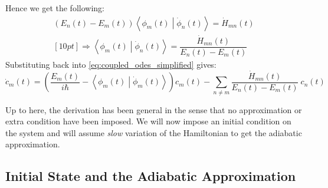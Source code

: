 \documentclass[12pt,a4paper]{article}
\begin{document}
	Hence we get the following:
	\begin{eqnarray}
		\left( E_{n}(t) - E_{m}(t) \right) \left\langle \phi_{m}(t) \middle| \dot{\phi}_{n}(t) \right\rangle = \dot{H}_{mn}(t) \\ [10pt]
		\Rightarrow \left\langle \phi_{m}(t) \middle| \dot{\phi}_{n}(t) \right\rangle = \dfrac{\dot{H}_{mn}(t)}{E_{n}(t) - E_{m}(t)}
		\label{eq:coupling_element}
	\end{eqnarray}
	Substituting back into \eqref{eq:coupled_odes_simplified} gives:
	\begin{equation}
		\boxed{
			\dot{c}_{m}(t) = \left( \frac{E_{m}(t)}{i \hbar} - \left\langle \phi_{m}(t) \middle| \dot{\phi}_{m}(t) \right\rangle \right)c_{m}(t) - \sum_{n \neq m} \dfrac{\dot{H}_{mn}(t)}{E_{n}(t) - E_{m}(t)}\ c_{n}(t)}
		\label{eq:final_coupled_odes}
	\end{equation}
	
	Up to here, the derivation has been general in the sense that no approximation or extra condition have been imposed. We will now impose an initial condition on the system and will assume \emph{slow} variation of the Hamiltonian to get the adiabatic approximation.
	
	\subsection{Initial State and the Adiabatic Approximation}
	\label{subsec:adiabatic_approx}
	
\end{document}
